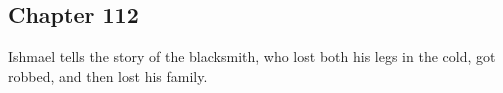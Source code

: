 \subsection{Chapter 112}

Ishmael tells the story of the blacksmith, who lost both his legs in the cold,
got robbed, and then lost his family.
